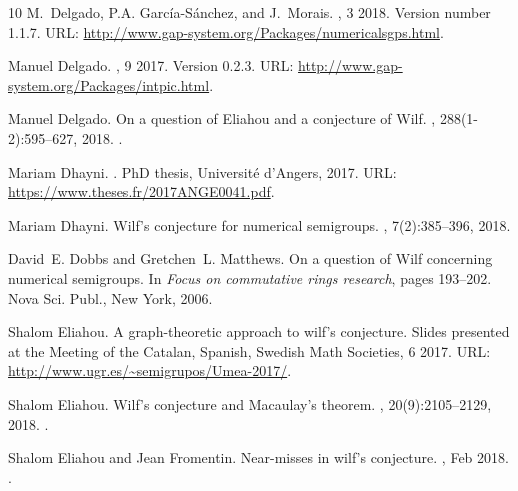 \begin{thebibliography}{10}
M.~Delgado, P.A. García-Sánchez, and J.~Morais.
, 3
  2018.
\newblock Version number 1.1.7.
\newblock URL: \url{http://www.gap-system.org/Packages/numericalsgps.html}.

Manuel Delgado.
, 9 2017.
\newblock Version 0.2.3.
\newblock URL: \url{http://www.gap-system.org/Packages/intpic.html}.

Manuel Delgado.
\newblock On a question of {E}liahou and a conjecture of {W}ilf.
, 288(1-2):595--627, 2018.
\newblock \href {http://dx.doi.org/10.1007/s00209-017-1902-3}
  {}.

Mariam Dhayni.
.
\newblock PhD thesis, Université d’Angers, 2017.
\newblock URL: \url{https://www.theses.fr/2017ANGE0041.pdf}.

Mariam Dhayni.
\newblock Wilf’s conjecture for numerical semigroups.
, 7(2):385--396, 2018.

David~E. Dobbs and Gretchen~L. Matthews.
\newblock On a question of {W}ilf concerning numerical semigroups.
\newblock In {\em Focus on commutative rings research}, pages 193--202. Nova
  Sci. Publ., New York, 2006.

Shalom Eliahou.
\newblock A graph-theoretic approach to wilf’s conjecture.
\newblock Slides presented at the Meeting of the Catalan, Spanish, Swedish Math
  Societies, 6 2017.
\newblock URL: \url{http://www.ugr.es/~semigrupos/Umea-2017/}.

Shalom Eliahou.
\newblock Wilf's conjecture and {M}acaulay's theorem.
, 20(9):2105--2129, 2018.
\newblock \href {http://dx.doi.org/10.4171/JEMS/807} {}.

Shalom Eliahou and Jean Fromentin.
\newblock Near-misses in wilf's conjecture.
, Feb 2018.
\newblock \href {http://dx.doi.org/10.1007/s00233-018-9926-5}
  {}.


\end{thebibliography}

